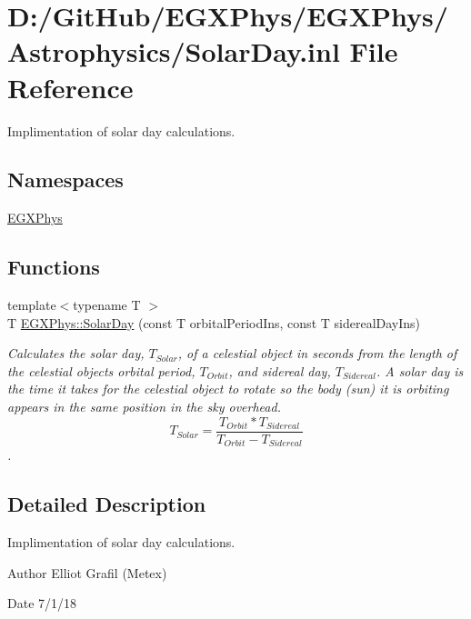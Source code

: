 \hypertarget{_solar_day_8inl}{}\section{D\+:/\+Git\+Hub/\+E\+G\+X\+Phys/\+E\+G\+X\+Phys/\+Astrophysics/\+Solar\+Day.inl File Reference}
\label{_solar_day_8inl}


Implimentation of solar day calculations.  


\subsection*{Namespaces}
\begin{DoxyCompactItemize}
\item 
 \mbox{\hyperlink{namespace_e_g_x_phys}{E\+G\+X\+Phys}}
\end{DoxyCompactItemize}
\subsection*{Functions}
\begin{DoxyCompactItemize}
\item 
{\footnotesize template$<$typename T $>$ }\\T \mbox{\hyperlink{group___e_g_x_phys-_astrophysic-_solar_day_gae321e0dd0c031a57c45b15dc819635e0}{E\+G\+X\+Phys\+::\+Solar\+Day}} (const T orbital\+Period\+Ins, const T sidereal\+Day\+Ins)
\begin{DoxyCompactList}\small\item\em Calculates the solar day, $T_{Solar}$, of a celestial object in seconds from the length of the celestial object\textquotesingle{}s orbital period, $T_{Orbit}$, and sidereal day, $T_{Sidereal}$. A solar day is the time it takes for the celestial object to rotate so the body (sun) it is orbiting appears in the same position in the sky overhead. \[ T_{Solar}=\dfrac{T_{Orbit} * T_{Sidereal}}{T_{Orbit} - T_{Sidereal}}\]. \end{DoxyCompactList}\end{DoxyCompactItemize}


\subsection{Detailed Description}
Implimentation of solar day calculations. 

\begin{DoxyAuthor}{Author}
Elliot Grafil (Metex) 
\end{DoxyAuthor}
\begin{DoxyDate}{Date}
7/1/18 
\end{DoxyDate}
